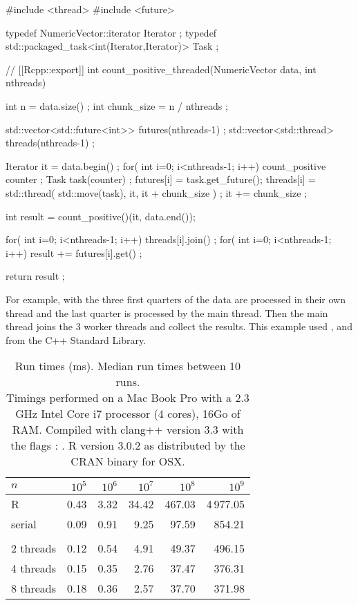 \begin{example}
#include <thread>
#include <future>

typedef NumericVector::iterator Iterator ;
typedef std::packaged_task<int(Iterator,Iterator)> Task ;

// [[Rcpp::export]]
int count_positive_threaded(NumericVector data, int nthreads){
  int n = data.size() ;
  int chunk_size = n / nthreads ; 
  
  std::vector<std::future<int>> futures(nthreads-1) ;
  std::vector<std::thread> threads(nthreads-1) ;
  
  Iterator it = data.begin() ;
  for( int i=0; i<nthreads-1; i++){
    count_positive counter ;        
    Task task(counter) ;
    futures[i] = task.get_future();
    threads[i] = std::thread( std::move(task), it, it + chunk_size ) ;
    it += chunk_size ;
  }
  
  int result = count_positive()(it, data.end()); 
  
  for( int i=0; i<nthreads-1; i++){
    threads[i].join() ;
  }
  for( int i=0; i<nthreads-1; i++){
    result += futures[i].get() ;  
  }
                            
  return result ;
}
\end{example}

For example, with  the three first quarters of the data
are processed in their own thread and the last quarter is processed by the 
main thread. Then the main thread joins the 3 worker threads and collect
the results. This example used ,  and
 from the C++ Standard Library. 

\begin{table}
\centering
\begin{tabular}{lrrrrr}
\toprule 
$n$ & $10^5$ & $10^6$ & $10^7$ & $10^8$ & $10^9$ \\ 
\midrule          
R         & 0.43 & 3.32  & 34.42 & 467.03 & 4\,977.05 \\
serial    & 0.09 & 0.91  &  9.25 &  97.59 &    854.21 \\
\hspace{1.5cm} & 
\hspace{1.5cm} & 
\hspace{1.5cm} &
\hspace{1.5cm} & 
\hspace{1.5cm} & 
\hspace{1.5cm} \\
2 threads & 0.12 & 0.54  &  4.91 &  49.37 &    496.15 \\
4 threads & 0.15 & 0.35  &  2.76 &  37.47 &    376.31 \\
8 threads & 0.18 & 0.36  &  2.57 &  37.70 &    371.98 \\
\bottomrule
\end{tabular}
\caption{\label{table:count}Run times (ms). Median run times between 10 runs.\\ 
{\footnotesize Timings performed on a Mac Book Pro with a 2.3 GHz Intel Core i7 processor (4 cores), 16Go of RAM. 
Compiled with clang++ version 3.3 with the flags : . R version 3.0.2 
as distributed by the CRAN binary for OSX. }}
\end{table}

